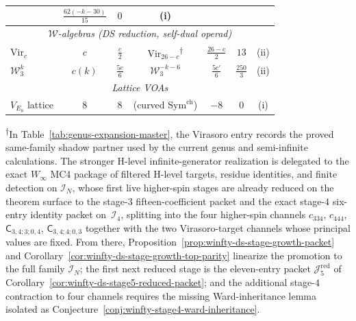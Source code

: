\begin{table}[ht]
{\begin{tabular}{|l|c|c|c|c|c|c|}
  & $\frac{62(-k{-}30)}{15}$ & $0$ & (i) \\
\hline
\multicolumn{7}{|c|}{\textit{$\mathcal{W}$-algebras (DS
  reduction, self-dual operad)}} \\
\hline
$\mathrm{Vir}_c$
  & $c$ & $\frac{c}{2}$
  & $\mathrm{Vir}_{26-c}$\textsuperscript{$\dagger$}
  & $\frac{26-c}{2}$ & $13$ & (ii) \\
\hline
$\mathcal{W}_3^k$
  & $c(k)$ & $\frac{5c}{6}$
  & $\mathcal{W}_3^{-k-6}$
  & $\frac{5c'}{6}$ & $\frac{250}{3}$ & (ii) \\
\hline
\multicolumn{7}{|c|}{\textit{Lattice VOAs}} \\
\hline
$V_{E_8}$ lattice
  & $8$ & $8$
  & (curved $\mathrm{Sym}^{\mathrm{ch}}$)
  & $-8$ & $0$ & (i) \\
\hline
\end{tabular}
}
\end{table}
\noindent\textsuperscript{$\dagger$}In Table~\ref{tab:genus-expansion-master},
the Virasoro entry records the proved same-family shadow partner used by
the current genus and semi-infinite calculations.  The stronger H-level
infinite-generator realization is delegated to the exact $W_\infty$
MC4 package of filtered H-level targets, residue identities, and finite
detection on $\mathcal{I}_N$, whose first live higher-spin stages are
already reduced on the theorem surface to the stage-$3$
fifteen-coefficient packet and the exact stage-$4$ six-entry identity
packet on~$\mathcal{I}_4$, splitting into the four higher-spin channels
$c_{334}$, $c_{444}$,
$\mathsf{C}_{3,4;3;0,4}$, $\mathsf{C}_{3,4;4;0,3}$ together with the
two Virasoro-target channels whose principal values are fixed.  From
there, Proposition~\ref{prop:winfty-ds-stage-growth-packet} and
Corollary~\ref{cor:winfty-ds-stage-growth-top-parity} linearize the
promotion to the full family $\mathcal{I}_N$; the first next reduced
stage is the eleven-entry packet
$\mathcal{J}_5^{\mathrm{red}}$ of
Corollary~\ref{cor:winfty-ds-stage5-reduced-packet}; and the additional
stage-$4$ contraction to four channels requires the missing
Ward-inheritance lemma isolated as
Conjecture~\ref{conj:winfty-stage4-ward-inheritance}.

